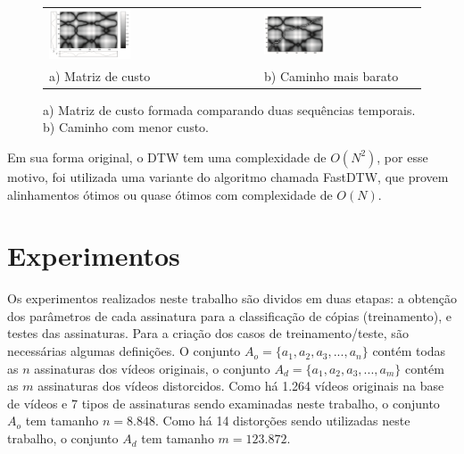 \begin{figure}[h]
    \centering
    \caption{a) Matriz de custo formada comparando duas sequências temporais. b) Caminho com menor custo.}
    \label{fig:dtw-caminho}
    \begin{tabular}{ll}
    \includegraphics[width=0.4\textwidth]{dados/figuras/dtw-comparacao} &
    \includegraphics[width=0.4\textwidth]{dados/figuras/dtw-comparacao-caminho} \\
    a) Matriz de custo & b) Caminho mais barato
    \end{tabular}
\end{figure}


Em sua forma original, o DTW tem uma complexidade de $ O(N^{2}) $, por esse motivo, foi utilizada uma variante do algoritmo chamada FastDTW, que provem alinhamentos ótimos ou quase ótimos com complexidade de $O(N)$. 


\section{Experimentos}
\label{sec:met-Experimentos}

Os experimentos realizados neste trabalho são dividos em duas etapas: a obtenção dos parâmetros de cada assinatura para a classificação de cópias (treinamento), e testes das assinaturas. Para a criação dos casos de treinamento/teste, são necessárias algumas definições. O conjunto $A_o = \{a_1, a_2, a_3, ..., a_n\}$ contém todas as $n$ assinaturas dos vídeos originais, o conjunto $A_d = \{a_1, a_2, a_3, ..., a_m\}$ contém as $m$ assinaturas dos vídeos distorcidos. Como há 1.264 vídeos originais na base de vídeos e 7 tipos de assinaturas sendo examinadas neste trabalho, o conjunto $A_o$ tem tamanho $n=8.848$. Como há 14 distorções sendo utilizadas neste trabalho, o conjunto $A_d$ tem tamanho $m=123.872$.

